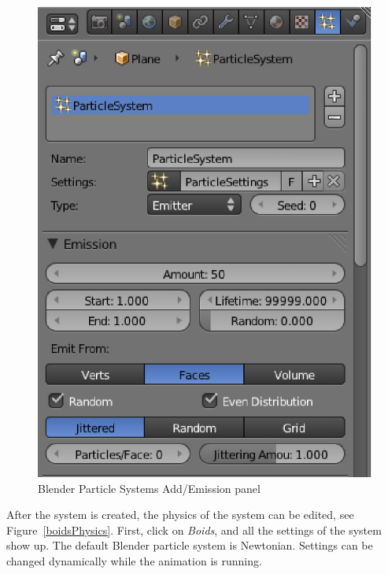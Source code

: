 \begin{figure}[htbp]
\begin{center}
\includegraphics[scale= 0.5]{figures/boidsCreatePS.eps} 
\caption{Blender Particle Systems Add/Emission panel}
\label{boidsCreatePS}
\end{center}
\end{figure}

After the system is created, the physics of the system can be edited, see Figure~\ref{boidsPhysics}. First, click on \textit{Boids}, and all the settings of the system show up. The default Blender particle system is Newtonian. Settings can be changed dynamically while the animation is running.

